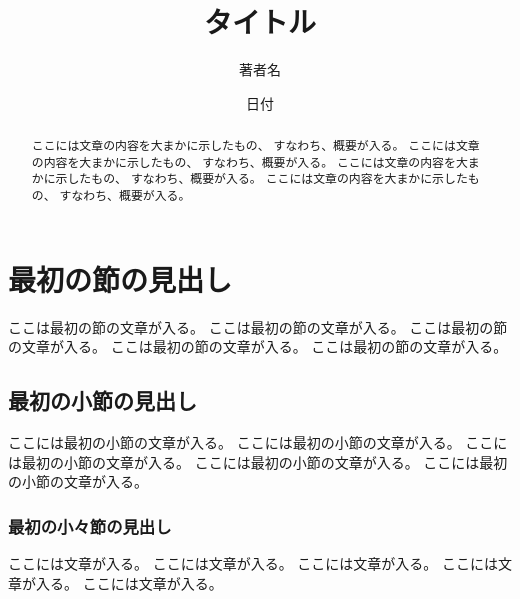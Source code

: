 \documentclass[ %
  papersize%
]{ltjsarticle}
\title{タイトル}
\author{著者名}
\date{日付}
\begin{document}
\maketitle

\begin{abstract}
ここには文章の内容を大まかに示したもの、
すなわち、概要が入る。
ここには文章の内容を大まかに示したもの、
すなわち、概要が入る。
ここには文章の内容を大まかに示したもの、
すなわち、概要が入る。
ここには文章の内容を大まかに示したもの、
すなわち、概要が入る。
\end{abstract}


\section{最初の節の見出し}

ここは最初の節の文章が入る。
ここは最初の節の文章が入る。
ここは最初の節の文章が入る。
ここは最初の節の文章が入る。
ここは最初の節の文章が入る。

\subsection{最初の小節の見出し}

ここには最初の小節の文章が入る。
ここには最初の小節の文章が入る。
ここには最初の小節の文章が入る。
ここには最初の小節の文章が入る。
ここには最初の小節の文章が入る。

\subsubsection{最初の小々節の見出し}

ここには文章が入る。
ここには文章が入る。
ここには文章が入る。
ここには文章が入る。
ここには文章が入る。
\end{document}
